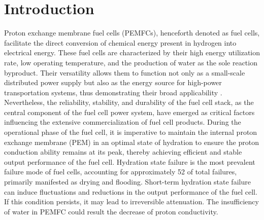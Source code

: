 \section{Introduction}
Proton exchange membrane fuel cells (PEMFCs), henceforth denoted as fuel cells, facilitate the direct conversion of chemical energy present in hydrogen into electrical energy.
These fuel cells are characterized by their high energy utilization rate, low operating temperature, and the production of water as the sole reaction byproduct.
Their versatility allows them to function not only as a small-scale distributed power supply but also as the energy source for high-power transportation systems, thus demonstrating their broad applicability \cite{sharafOverviewFuelCell2014} .
Nevertheless, the reliability, stability, and durability of the fuel cell stack, as the central component of the fuel cell power system, have emerged as critical factors influencing the extensive commercialization of fuel cell products.
During the operational phase of the fuel cell, it is imperative to maintain the internal proton exchange membrane (PEM) in an optimal state of hydration to ensure the proton conduction ability remains at its peak, thereby achieving efficient and stable output performance of the fuel cell. 
Hydration state failure is the most prevalent failure mode of fuel cells, accounting for approximately 52 of total failures, primarily manifested as drying and flooding. 
Short-term hydration state failure can induce fluctuations and reductions in the output performance of the fuel cell. If this condition persists, it may lead to irreversible attenuation.
The insufficiency of water in PEMFC could result the decrease of proton conductivity\cite{shen_partial_2020,ous_degradation_2013,xiao_influence_2023}.

